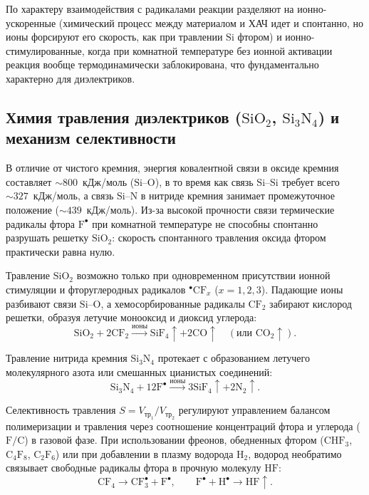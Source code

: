 \documentclass[12pt,a4paper]{article}
\theoremstyle{plain}
\theoremstyle{definition}
\theoremstyle{remark}
\numberwithin{equation}{section}
\begin{document}
По характеру взаимодействия с радикалами реакции разделяют на ионно-ускоренные (химический процесс между материалом и ХАЧ идет и спонтанно, но ионы форсируют его скорость, как при травлении $\mathrm{Si}$ фтором) и ионно-стимулированные, когда при комнатной температуре без ионной активации реакция вообще термодинамически заблокирована, что фундаментально характерно для диэлектриков.

\subsection{Химия травления диэлектриков ($\mathrm{SiO}_2$, $\mathrm{Si}_3\mathrm{N}_4$) и механизм селективности}

В отличие от чистого кремния, энергия ковалентной связи в оксиде кремния составляет $\sim 800$~кДж/моль ($\mathrm{Si}\text{--}\mathrm{O}$), в то время как связь $\mathrm{Si}\text{--}\mathrm{Si}$ требует всего $\sim 327$~кДж/моль, а связь $\mathrm{Si}\text{--}\mathrm{N}$ в нитриде кремния занимает промежуточное положение ($\sim 439$~кДж/моль). Из-за высокой прочности связи термические радикалы фтора $\mathrm{F}^\bullet$ при комнатной температуре не способны спонтанно разрушать решетку $\mathrm{SiO}_2$: скорость спонтанного травления оксида фтором практически равна нулю.

Травление $\mathrm{SiO}_2$ возможно только при одновременном присутствии ионной стимуляции и фторуглеродных радикалов $^\bullet\mathrm{CF}_x$ ($x = 1, 2, 3$). Падающие ионы разбивают связи $\mathrm{Si}\text{--}\mathrm{O}$, а хемосорбированные радикалы $\mathrm{CF}_2$ забирают кислород решетки, образуя летучие монооксид и диоксид углерода:
\begin{equation*}
  \mathrm{SiO}_2 + 2\mathrm{CF}_2 \xrightarrow{\text{ионы}} \mathrm{SiF}_4\uparrow + 2\mathrm{CO}\uparrow \quad (\text{или } \mathrm{CO}_2\uparrow).
\end{equation*}

Травление нитрида кремния $\mathrm{Si}_3\mathrm{N}_4$ протекает с образованием летучего молекулярного азота или смешанных цианистых соединений:
\begin{equation*}
  \mathrm{Si}_3\mathrm{N}_4 + 12\mathrm{F}^\bullet \xrightarrow{\text{ионы}} 3\mathrm{SiF}_4\uparrow + 2\mathrm{N}_2\uparrow.
\end{equation*}

Селективность травления $S = V_{\text{тр}_1} / V_{\text{тр}_2}$ регулируют управлением балансом полимеризации и травления через соотношение концентраций фтора и углерода ($\mathrm{F}/\mathrm{C}$) в газовой фазе. При использовании фреонов, обедненных фтором ($\mathrm{CHF}_3$, $\mathrm{C}_4\mathrm{F}_8$, $\mathrm{C}_2\mathrm{F}_6$) или при добавлении в плазму водорода $\mathrm{H}_2$, водород необратимо связывает свободные радикалы фтора в прочную молекулу $\mathrm{HF}$:
\begin{equation*}
  \mathrm{CF}_4 \to \mathrm{CF}_3^\bullet + \mathrm{F}^\bullet, \qquad \mathrm{F}^\bullet + \mathrm{H}^\bullet \to \mathrm{HF}\uparrow.
\end{equation*}
\end{document}
